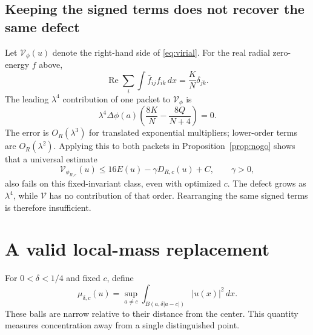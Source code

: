 \documentclass[11pt,a4paper]{article}
\theoremstyle{remark}\newtheorem{remark}[theorem]{Remark}
\newcommand{\dd}{\,dx}
\DeclareMathOperator{\Rea}{Re}
\begin{document}
\subsection{Keeping the signed terms does not recover the same defect}
Let $\mathcal V_\phi(u)$ denote the right-hand side of \eqref{eq:virial}. For the real radial zero-energy $f$ above,
\[
 \Rea\sum_i\int\bar f_{ij}f_{ik}\dd=\frac KN\delta_{jk}.
\]
The leading $\lambda^4$ contribution of one packet to $\mathcal V_\phi$ is
\[
 \lambda^4\Delta\phi(a)\left(\frac{8K}{N}-\frac{8Q}{N+4}\right)=0.
\]
The error is $O_R(\lambda^3)$ for translated exponential multipliers; lower-order terms are $O_R(\lambda^2)$. Applying this to both packets in Proposition~\ref{prop:nogo} shows that a universal estimate
\[
 \mathcal V_{\phi_{R,c}}(u)\le16E(u)-\gamma D_{R,c}(u)+C,\qquad\gamma>0,
\]
also fails on this fixed-invariant class, even with optimized $c$. The defect grows as $\lambda^4$, while $\mathcal V$ has no contribution of that order. Rearranging the same signed terms is therefore insufficient.

\section{A valid local-mass replacement}
For $0<\delta<1/4$ and fixed $c$, define
\begin{equation}\label{eq:mu}
 \mu_{\delta,c}(u)=\sup_{a\ne c}\int_{B(a,\delta|a-c|)}|u(x)|^2\dd.
\end{equation}
These balls are narrow relative to their distance from the center. This quantity measures concentration away from a single distinguished point.
\end{document}
